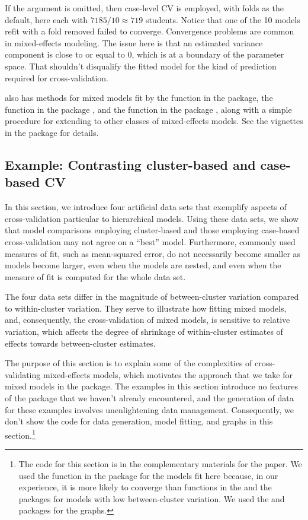 \documentclass[
]{jss}
\begin{document}
If the  argument is omitted, then case-level CV
is employed, with  folds as the default, here each with
\(7185/10 \approx 719\) students. Notice that one of the 10 models refit
with a fold removed failed to converge. Convergence problems are common
in mixed-effects modeling. The issue here is that an estimated variance
component is close to or equal to 0, which is at a boundary of the
parameter space. That shouldn't disqualify the fitted model for the kind
of prediction required for cross-validation.

 also has methods for mixed models fit by the 
function in the  package, the  function in the
 package \citep{PinheiroBates:2000}, and the 
function in the  package \citep{BrooksEtAl}, along with a
simple procedure for extending  to other classes of
mixed-effects models. See the vignettes in the  package for
details.

\subsection{Example: Contrasting cluster-based and case-based
CV}\label{example-contrasting-cluster-based-and-case-based-cv}

In this section, we introduce four artificial data sets that exemplify
aspects of cross-validation particular to hierarchical models. Using
these data sets, we show that model comparisons employing cluster-based
and those employing case-based cross-validation may not agree on a
``best'' model. Furthermore, commonly used measures of fit, such as
mean-squared error, do not necessarily become smaller as models become
larger, even when the models are nested, and even when the measure of
fit is computed for the whole data set.

The four data sets differ in the magnitude of between-cluster variation
compared to within-cluster variation. They serve to illustrate how
fitting mixed models, and, consequently, the cross-validation of mixed
models, is sensitive to relative variation, which affects the degree of
shrinkage of within-cluster estimates of effects towards between-cluster
estimates.

The purpose of this section is to explain some of the complexities of
cross-validating mixed-effects models, which motivates the approach that
we take for mixed models in the  package. The examples in this
section introduce no features of the  package that we haven't
already encountered, and the generation of data for these examples
involves unenlightening data management. Consequently, we don't show the
code for data generation, model fitting, and graphs in this
section.\footnote{The code for this section is in the complementary
  materials for the paper. We used the  function in the
   package \citep{BrooksEtAl} for the models fit here
  because, in our experience, it is more likely to converge than
  functions in the  and the  packages for models
  with low between-cluster variation. We used the 
  \citep{Sarkar:2008} and  \citep{SarkarAndrews:2022}
  packages for the graphs.}
\end{document}
